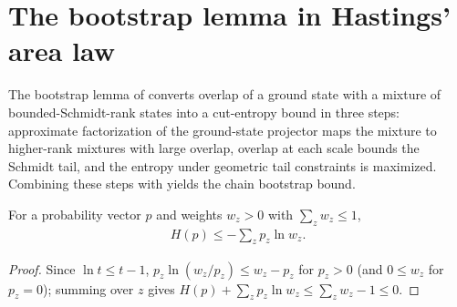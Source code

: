 \section{The bootstrap lemma in Hastings' area law}
\label{sec:hastings_bootstrap}


The bootstrap lemma of \cite{Hastings2007AreaLaw} converts overlap of a ground
state with a mixture of bounded-Schmidt-rank states into a cut-entropy bound in
three steps: approximate factorization of the ground-state projector maps the
mixture to higher-rank mixtures with large overlap, overlap at each scale bounds
the Schmidt tail, and the entropy under geometric tail constraints is
maximized. Combining these steps with \cite[Lemma~1]{Hastings2007AreaLaw} yields
the chain bootstrap bound.

\begin{lemma}
    \label{thm:hastings_gibbs_inequality}
    \leanok
    For a probability vector $p$ and weights $w_z>0$ with $\sum_zw_z\le1$,
    \begin{align}
        H(p)\le-\sum_zp_z\ln w_z.
        \label{eq:hastings_gibbs_inequality}
    \end{align}
\end{lemma}
\begin{proof}\leanok
    Since $\ln t\le t-1$, $p_z\ln(w_z/p_z)\le w_z-p_z$ for $p_z>0$ (and $0\le w_z$
    for $p_z=0$); summing over $z$ gives
    $H(p)+\sum_zp_z\ln w_z\le\sum_zw_z-1\le0$.
\end{proof}


